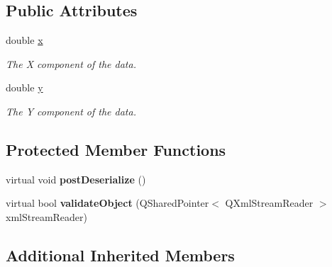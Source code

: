 \subsection*{Public Attributes}
\begin{DoxyCompactItemize}
\item 
\hypertarget{class_picto_1_1_behavioral_data_unit_ad8ddd235f938751a22c98a30db4c8224}{double \hyperlink{class_picto_1_1_behavioral_data_unit_ad8ddd235f938751a22c98a30db4c8224}{x}}\label{class_picto_1_1_behavioral_data_unit_ad8ddd235f938751a22c98a30db4c8224}

\begin{DoxyCompactList}\small\item\em The X component of the data. \end{DoxyCompactList}\item 
\hypertarget{class_picto_1_1_behavioral_data_unit_a0ea4855bd7c687705981506cc3836301}{double \hyperlink{class_picto_1_1_behavioral_data_unit_a0ea4855bd7c687705981506cc3836301}{y}}\label{class_picto_1_1_behavioral_data_unit_a0ea4855bd7c687705981506cc3836301}

\begin{DoxyCompactList}\small\item\em The Y component of the data. \end{DoxyCompactList}\end{DoxyCompactItemize}
\subsection*{Protected Member Functions}
\begin{DoxyCompactItemize}
\item 
\hypertarget{class_picto_1_1_behavioral_data_unit_a8203407c409e7f6da4961566eb5dde5e}{virtual void {\bfseries post\-Deserialize} ()}\label{class_picto_1_1_behavioral_data_unit_a8203407c409e7f6da4961566eb5dde5e}

\item 
\hypertarget{class_picto_1_1_behavioral_data_unit_ade3bdb141184724f9cdaf79b3fb73e99}{virtual bool {\bfseries validate\-Object} (Q\-Shared\-Pointer$<$ Q\-Xml\-Stream\-Reader $>$ xml\-Stream\-Reader)}\label{class_picto_1_1_behavioral_data_unit_ade3bdb141184724f9cdaf79b3fb73e99}

\end{DoxyCompactItemize}
\subsection*{Additional Inherited Members}


